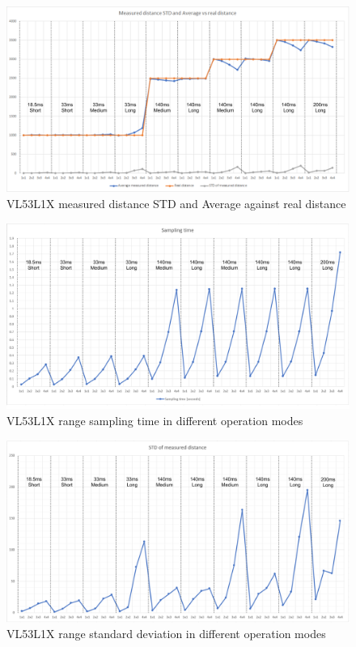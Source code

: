 \begin{figure}[ht]
    \centering
    \includegraphics[width=150mm, keepaspectratio]{figures/vl53l1x_measurements_opmodes.png}
    \caption{VL53L1X measured distance STD and Average against real distance}
    \label{fig:vl53l1x_meas_opmodes}
\end{figure}
\begin{figure}[!h]
    \centering
    \includegraphics[width=150mm, keepaspectratio]{figures/vl53l1x_measurements_opmodes_sampling.png}
    \caption{VL53L1X range sampling time in different operation modes}
    \label{fig:vl53l1x_meas_opmodes_sampling}
\end{figure}

\newpage

\begin{figure}[!h]
    \centering
    \includegraphics[width=150mm, keepaspectratio]{figures/vl53l1x_measurements_opmodes_std.png}
    \caption{VL53L1X range standard deviation in different operation modes}
    \label{fig:vl53l1x_meas_opmodes_std}
\end{figure}

